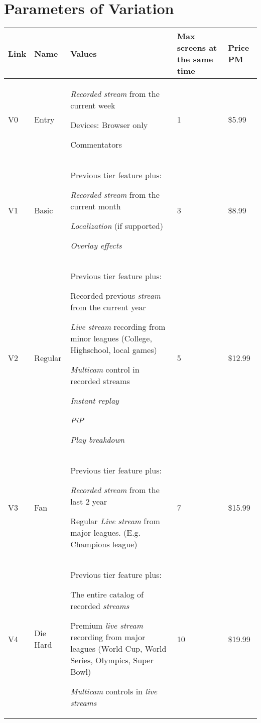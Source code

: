 \section{Parameters of Variation}
\begin{center}
\begin{tabular}{|p{}|p{}|p{}|p{}|p{}|}
\hline
	Link & Name & Values & Max screens at the same time & Price PM  \\ 
\hline
V0 & Entry & \begin{packed_enum}
	\small{
		\item \textit{Recorded stream} from the current week
		\item Devices: Browser only
		\item Commentators
	}
\end{packed_enum} & 1 & \$5.99 \\ 
\hline
V1 & Basic & Previous tier feature plus: \begin{packed_enum}
	\small{
		\item \textit{Recorded stream} from the current month
		\item\textit{Localization} (if supported)
		\item \textit{Overlay effects}
	}
\end{packed_enum} & 3 & \$8.99 \\ 
\hline
V2 & Regular & Previous tier feature plus: \begin{packed_enum}
	\small{
		\item Recorded previous \textit{stream} from the current year
		\item \textit{Live stream} recording from minor 
		leagues (College, Highschool, local games)
		\item \textit{Multicam} control in recorded streams
		\item \textit{Instant replay}
		\item \textit{PiP}
		\item \textit{Play breakdown}
	}
\end{packed_enum} & 5 & \$12.99 \\ 
\hline
V3 & Fan & Previous tier feature plus: \begin{packed_enum}
	\small{
		\item \textit{Recorded stream} from the last 2 year
		\item Regular \textit{Live stream} from major leagues. (E.g. Champions 
		league)
	}
\end{packed_enum} & 7 & \$15.99 \\ 
\hline
V4 & Die Hard & Previous tier feature plus: \begin{packed_enum}
	\small{
		\item The entire catalog of recorded \textit{streams}
		\item Premium \textit{live stream} recording from 
		major leagues (World Cup, World Series, Olympics, Super Bowl)
		\item \textit{Multicam} controls in \textit{live streams}
	}
\end{packed_enum} & 10 & \$19.99 \\ 
\hline
\end{tabular}
\end{center}